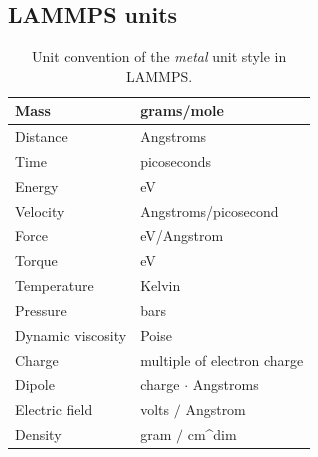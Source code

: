 \documentclass[twoside,english]{uiofysmaster}
\begin{document}

\appendix

\chapter{ }
\section{LAMMPS units}

\begin{table}[H]
	\begin{center}
		\caption{Unit convention of the \textit{metal} unit style in LAMMPS.}
		\begin{tabularx}{0.8\textwidth}{  @{\hspace{2em}} @{}XX@{} @{\hspace{2em}} }
			\toprule
			Mass 					   & grams/mole\\ 
			\midrule
			Distance 		   		  & Angstroms\\
			\midrule
			Time 				 		& picoseconds\\
			\midrule
			Energy 			   		  & eV\\
			\midrule
			Velocity 		   		  & Angstroms/picosecond\\
			\midrule
			Force 			    	   & eV/Angstrom\\
			\midrule
			Torque 			    	  & eV\\
			\midrule
			Temperature    		  & Kelvin\\
			\midrule
			Pressure 		 		 & bars\\
			\midrule
			Dynamic viscosity & Poise\\
			\midrule
			Charge 					 & multiple of electron charge\\
			\midrule
			Dipole 					 & charge $\cdot$ Angstroms\\
			\midrule
			Electric field 		    & volts $/$ Angstrom\\
			\midrule
			Density 				& gram $/$ cm\^{}dim\\
			\bottomrule
		\end{tabularx}
		\label{tab:unitsMetal}
	\end{center}
\end{table}

\newpage
\end{document}
